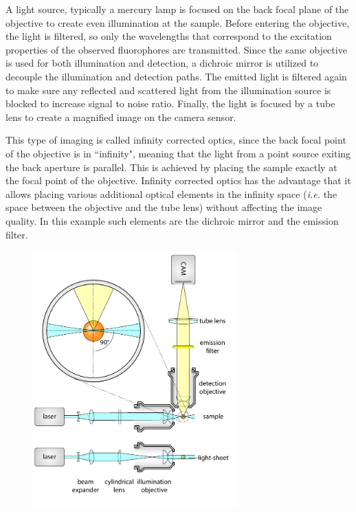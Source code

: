     A light source, typically a mercury lamp is focused on the back focal plane of the objective to create even illumination at the sample. Before entering the objective, the light is filtered, so only the wavelengths that correspond to the excitation properties of the observed fluorophores are transmitted. Since the same objective is used for both illumination and detection, a dichroic mirror is utilized to decouple the illumination and detection paths. The emitted light is filtered again to make sure any reflected and scattered light from the illumination source is blocked to increase signal to noise ratio.
    Finally, the light is focused by a tube lens to create a magnified image on the camera sensor.
    
    This type of imaging is called infinity corrected optics, since the back focal point of the objective is in ``infinity", meaning that the light from a point source exiting the back aperture is parallel. This is achieved by placing the sample exactly at the focal point of the objective. Infinity corrected optics has the advantage that it allows placing various additional optical elements in the infinity space (\textit{i.e.} the space between the objective and the tube lens) without affecting the image quality. In this example such elements are the dichroic mirror and the emission filter. 

    \begin{figure}[tb]
      \centering
      \includegraphics[page=4,width=0.7\textwidth]{spim_cyl}
      \label{fig:wide-field}
    \end{figure}



